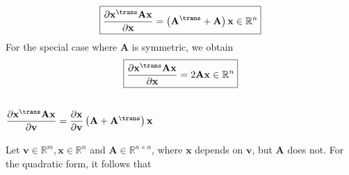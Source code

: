 \begin{align}
    \label{eq:quadratic-solution}
    \boxed{\dfrac{\partial \mathbf{x}^\trans \mathbf{A} \mathbf{x}}{\partial \mathbf{x}} = \left(\mathbf{A}^\trans + \mathbf{A}\right) \mathbf{x} \in \mathbb{R}^{n}}
\end{align}
For the special case where \(\mathbf{A}\) is symmetric, we obtain
\begin{align}
    \boxed{\dfrac{\partial \mathbf{x}^\trans \mathbf{A} \mathbf{x}}{\partial \mathbf{x}} = 2\mathbf{A} \mathbf{x} \in \mathbb{R}^{n}}
\end{align}

\subsection{\(\dfrac{\partial \mathbf{x}^\trans \mathbf{A} \mathbf{x}}{\partial \mathbf{v}} = \dfrac{\partial \mathbf{x}}{\partial \mathbf{v}}\left( \mathbf{A} + \mathbf{A}^\trans \right) \mathbf{x}\)}
Let \(\mathbf{v} \in \mathbb{R}^{m}, \mathbf{x} \in \mathbb{R}^{n}\) and \(\mathbf{A}\in \mathbb{R}^{n\times n}\), where \(\mathbf{x}\) depends on \(\mathbf{v}\), but \(\mathbf{A}\) does not. For the quadratic form, it follows that
